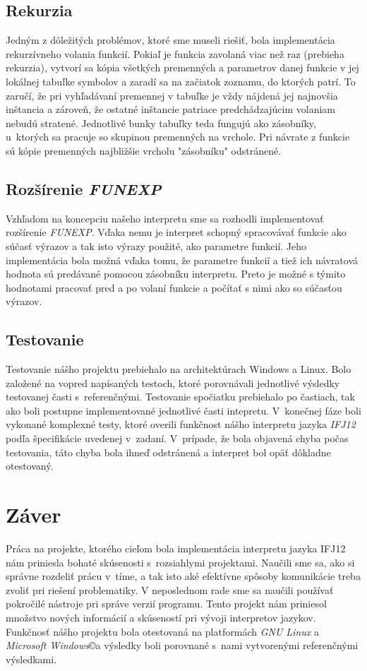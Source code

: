 \documentclass[12pt,a4paper,titlepage,final]{article}
\begin{document}
\subsection{Rekurzia}
Jedným z dôležitých problémov, ktoré sme museli riešiť, bola implementácia rekurzívneho volania funkcií. Pokiaľ je funkcia zavolaná viac než raz (prebieha rekurzia), vytvorí sa kópia všetkých premenných a parametrov danej funkcie v jej lokálnej tabuľke symbolov a zaradí sa na začiatok zoznamu, do ktorých patrí. To zaručí, že pri vyhľadávaní premennej v tabuľke je vždy nájdená jej najnovšia inštancia a zároveň, že ostatné inštancie patriace predchádzajúcim volaniam nebudú stratené. Jednotlivé bunky tabuľky teda fungujú ako zásobníky, u~ktorých sa pracuje so skupinou premenných na vrchole. Pri návrate z funkcie sú kópie premenných najbližšie vrcholu "zásobníku" odstránené.

\subsection{Rozšírenie \emph{FUNEXP}}
Vzhľadom na koncepciu našeho interpretu sme sa rozhodli implementovať rozšírenie \emph{FUNEXP}. Vďaka nemu je interpret schopný spracovávať funkcie ako súčasť výrazov a tak isto výrazy použité, ako parametre funkcií. Jeho implementácia bola možná vďaka tomu, že parametre funkcií a tiež ich návratová hodnota sú predávané pomocou zásobníku interpretu. Preto je možné s týmito hodnotami pracovať pred a po volaní funkcie a počítať s nimi ako so súčasťou výrazov.

\subsection{Testovanie}
Testovanie nášho projektu prebiehalo na architektúrach Windows a Linux. Bolo založené na vopred napísaných testoch, ktoré porovnávali jednotlivé výsledky testovanej časti s~referenčnými. Testovanie spočiatku prebiehalo po častiach, tak ako boli postupne implementované jednotlivé časti intepretu.
V~konečnej fáze boli vykonané komplexné testy, ktoré overili funkčnost nášho interpretu jazyka \emph{IFJ12} podľa špecifikácie uvedenej v~zadaní. V~prípade, že bola objavená chyba počas testovania, táto chyba bola ihneď odstránená a interpret bol opäť dôkladne otestovaný.
\newpage
\section{Záver}
Práca na projekte, ktorého cieľom bola implementácia interpretu jazyka IFJ12 nám priniesla bohaté skúsenosti s~rozsiahlymi projektami. Naučili sme sa, ako si správne rozdeliť prácu v~tíme, a tak isto aké efektívne spôsoby komunikácie treba zvoliť pri riešení problematiky. V neposlednom rade sme sa naučili používať pokročilé nástroje pri správe verzií programu. Tento projekt nám priniesol množstvo nových informácií a skúseností pri vývoji interpretov jazykov. Funkčnosť nášho projektu bola otestovaná na platformách \emph{GNU Linux} a \emph{Microsoft Windows}\copyright  a výsledky boli porovnané s~nami vytvorenými referenčnými výsledkami.
\end{document}
